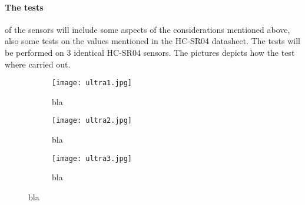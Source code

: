 \paragraph{The tests} of the sensors will include some aspects of the considerations mentioned above, also some tests on the values mentioned in the HC-SR04 datasheet\cite{hcsr04}. The tests will be performed on 3 identical HC-SR04 sensors. The pictures  depicts how the test where carried out.

\begin{figure}[htbp]
  \begin{subfigure}{.3\textwidth}
    \centering
    \texttt{[image: ultra1.jpg]}
    \caption{bla}
    \label{fig:ultra1}
  \end{subfigure}
  \begin{subfigure}{.3\textwidth}
    \centering
    \texttt{[image: ultra2.jpg]}
    \caption{bla}
    \label{fig:ultra2}
  \end{subfigure}
  \begin{subfigure}{.3\textwidth}
    \centering
    \texttt{[image: ultra3.jpg]}
    \caption{bla}
    \label{fig:ultra3}
  \end{subfigure}
\end{figure}
  
